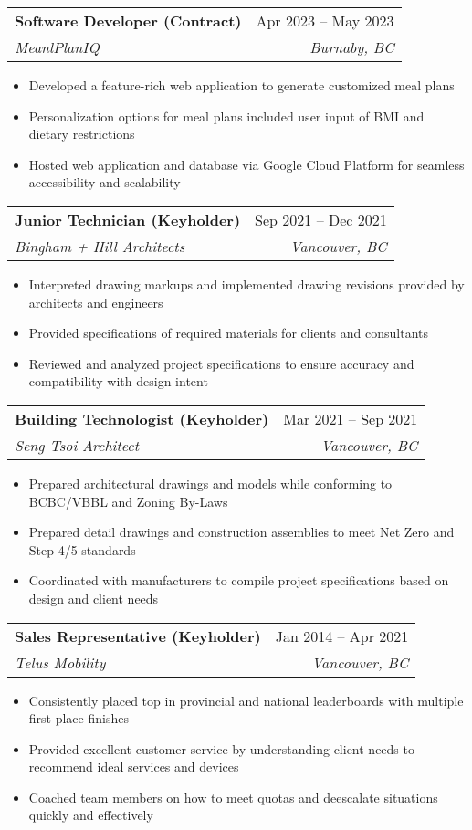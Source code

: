 \documentclass[letterpaper,11pt]{article}
\makeatletter
\newcommand{\resumeItem}[1]{
  \item\small{
    {#1 \vspace{-2pt}}
  }
}
\newcommand{\resumeSubheading}[4]{
  \vspace{-2pt}\item
    \begin{tabular*}{0.97\textwidth}[t]{l@{\extracolsep{\fill}}r}
      \textbf{#1} & #2 \\
      \textit{\small#3} & \textit{\small #4} \\
    \end{tabular*}\vspace{-7pt}
}
\newcommand{\resumeSubSubheading}[2]{
    \item
    \begin{tabular*}{0.97\textwidth}{l@{\extracolsep{\fill}}r}
      \textit{\small#1} & \textit{\small #2} \\
    \end{tabular*}\vspace{-7pt}
}
\newcommand{\resumeSubHeadingListEnd}{\end{itemize}}
\newcommand{\resumeItemListStart}{\begin{itemize}}
\newcommand{\resumeItemListEnd}{\end{itemize}\vspace{-5pt}}
\makeatother
\begin{document}
	\resumeSubheading
	  {Software Developer (Contract)}{Apr 2023 -- May 2023}
	  {MeanlPlanIQ}{Burnaby, BC}
	  \resumeItemListStart
	    \resumeItem{Developed a feature-rich web application to generate customized meal plans}
		\resumeItem{Personalization options for meal plans included user input of BMI and dietary restrictions}
		\resumeItem{Hosted web application and database via Google Cloud Platform for seamless accessibility and scalability}
	\resumeItemListEnd

    \resumeSubheading
	  {Junior Technician (Keyholder)}{Sep 2021 -- Dec 2021}
	  {Bingham + Hill Architects}{Vancouver, BC}
      \resumeItemListStart
        \resumeItem{Interpreted drawing markups and implemented drawing revisions provided by architects and engineers}
        \resumeItem{Provided specifications of required materials for clients and consultants}
        \resumeItem{Reviewed and analyzed project specifications to ensure accuracy and compatibility with design intent}
	\resumeItemListEnd
      

    \resumeSubheading
	  {Building Technologist (Keyholder)}{Mar 2021 -- Sep 2021}
	  {Seng Tsoi Architect}{Vancouver, BC}
      \resumeItemListStart
        \resumeItem{Prepared architectural drawings and models while conforming to BCBC/VBBL and Zoning By-Laws}
        \resumeItem{Prepared detail drawings and construction assemblies to meet Net Zero and Step 4/5 standards}
        \resumeItem{Coordinated with manufacturers to compile project specifications based on design and client needs}
    \resumeItemListEnd

    \resumeSubheading
	  {Sales Representative (Keyholder)}{Jan 2014 -- Apr 2021}
	  {Telus Mobility}{Vancouver, BC}
      \resumeItemListStart
	    \resumeItem{Consistently placed top in provincial and national leaderboards with multiple first-place finishes}
        \resumeItem{Provided excellent customer service by understanding client needs to recommend ideal services and devices}
        \resumeItem{Coached team members on how to meet quotas and deescalate situations quickly and effectively}
	\resumeItemListEnd
\end{document}

